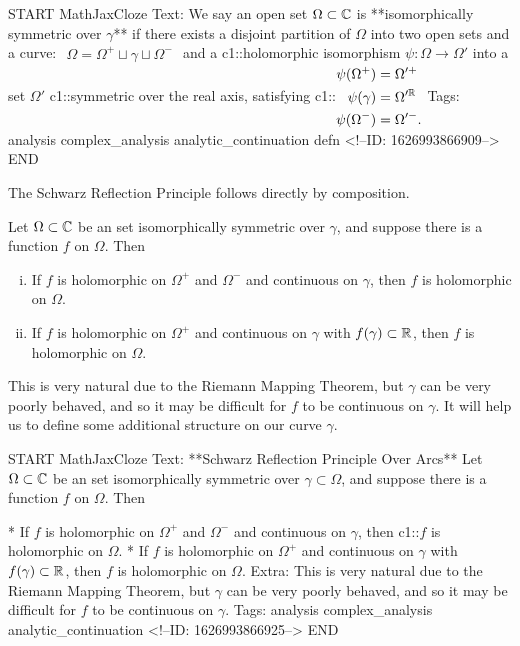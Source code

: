 \documentclass{memoir}
\begin{document}
\begin{anki}
START
MathJaxCloze
Text: We say an open set \(\Omega\subset \mathbb{C} \) is **isomorphically symmetric over \(\gamma \)** if there exists a disjoint partition of \(\Omega \) into two open sets and a curve:
\(\begin{align*}
  	\Omega = \Omega^{+} \sqcup \gamma \sqcup \Omega^{-}
  \end{align*}\)
and a {{c1::holomorphic isomorphism}} \(\psi:\Omega \to \Omega'\) into a set \(\Omega '\) {{c1::symmetric over the real axis}}, satisfying
{{c1::\(\begin{align*}
        	\psi (\Omega^{+}) &= \Omega'^{+}\\
        	\psi(\gamma ) &= \Omega'^{\mathbb{R}}\\
        	\psi (\Omega^{-}) &= \Omega'^{-}.
        \end{align*}\)}} 
Tags: analysis complex_analysis analytic_continuation defn
<!--ID: 1626993866909-->
END
\end{anki}

The Schwarz Reflection Principle follows directly by composition.
\begin{thm}
	Let  \(\Omega \subset \mathbb{C}\) be an set isomorphically symmetric over \(\gamma \), and suppose there is a function \(f\) on \(\Omega \). Then
	\begin{enumerate}[(i).]
		\item If \(f\) is holomorphic on \(\Omega^{+}\) and \(\Omega^{-}\) and continuous on \(\gamma \), then \(f\) is holomorphic on \(\Omega \).
		\item If \(f\) is holomorphic on \(\Omega^{+}\) and continuous on \(\gamma \) with \(f(\gamma)\subset \mathbb{R}\), then \(f\) is holomorphic on \(\Omega \).
	\end{enumerate}
\end{thm}

This is very natural due to the Riemann Mapping Theorem, but \(\gamma \) can be very poorly behaved, and so it may be difficult for \(f\) to be continuous on \(\gamma \).
It will help us to define some additional structure on our curve \(\gamma \).

\begin{anki}
START
MathJaxCloze
Text: **Schwarz Reflection Principle Over Arcs**
Let  \(\Omega \subset \mathbb{C}\) be an set isomorphically symmetric over \(\gamma\subset \Omega \), and suppose there is a function \(f\) on \(\Omega \). Then

* If \(f\) is holomorphic on \(\Omega^{+}\) and \(\Omega^{-}\) and continuous on \(\gamma \), then {{c1::\(f\) is holomorphic on \(\Omega \)}}.
* If \(f\) is holomorphic on \(\Omega^{+}\) and continuous on \(\gamma \) with \(f(\gamma)\subset \mathbb{R}\), then \(f\) is holomorphic on \(\Omega \).
Extra: This is very natural due to the Riemann Mapping Theorem, but \(\gamma \) can be very poorly behaved, and so it may be difficult for \(f\) to be continuous on \(\gamma \).
Tags: analysis complex_analysis analytic_continuation
<!--ID: 1626993866925-->
END
\end{anki}







\end{document}
